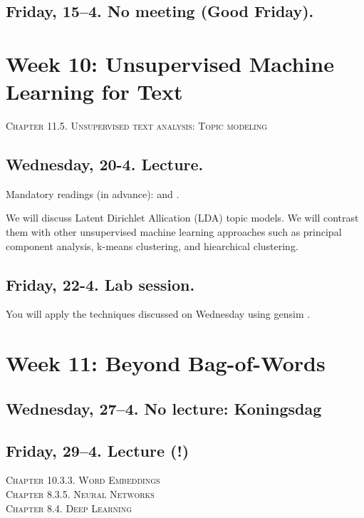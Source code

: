 \subsection*{Friday, 15--4. No meeting (Good Friday).}




\section*{Week 10: Unsupervised Machine Learning for Text}
\textsc{ Chapter 11.5. Unsupervised text analysis: Topic modeling}\\

\subsection*{Wednesday, 20-4. Lecture.}
Mandatory readings (in advance): \cite{Maier2018a} and \cite{Tsur2015}.

We will discuss Latent Dirichlet Allication (LDA) topic models. We will contrast them with other unsupervised machine learning approaches such as principal component analysis, k-means clustering, and hiearchical clustering.


\subsection*{Friday, 22-4. Lab session.}
You will apply the techniques discussed on Wednesday using gensim \citep{Rehurek2010}.






\section*{Week 11: Beyond Bag-of-Words}

\subsection*{Wednesday, 27--4. No lecture: Koningsdag}

\subsection*{Friday, 29--4. Lecture (!)}
\textsc{ Chapter 10.3.3. Word Embeddings}\\
\textsc{ Chapter 8.3.5. Neural Networks}\\
\textsc{ Chapter 8.4. Deep Learning}\\

